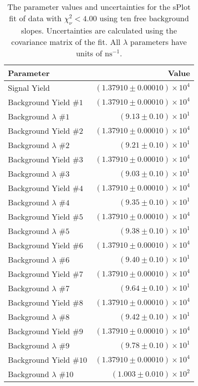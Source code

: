
\begin{table}[ht]
    \begin{center}
        \begin{tabular}{lr}\toprule
            Parameter & Value \\\midrule
            Signal Yield & $(1.37910 \pm 0.00010) \times 10^{4}$ \\
            Background Yield $\#1$ & $(1.37910 \pm 0.00010) \times 10^{4}$ \\
            Background $\lambda$ $\#1$ & $(9.13 \pm 0.10) \times 10^{1}$ \\
            Background Yield $\#2$ & $(1.37910 \pm 0.00010) \times 10^{4}$ \\
            Background $\lambda$ $\#2$ & $(9.21 \pm 0.10) \times 10^{1}$ \\
            Background Yield $\#3$ & $(1.37910 \pm 0.00010) \times 10^{4}$ \\
            Background $\lambda$ $\#3$ & $(9.03 \pm 0.10) \times 10^{1}$ \\
            Background Yield $\#4$ & $(1.37910 \pm 0.00010) \times 10^{4}$ \\
            Background $\lambda$ $\#4$ & $(9.35 \pm 0.10) \times 10^{1}$ \\
            Background Yield $\#5$ & $(1.37910 \pm 0.00010) \times 10^{4}$ \\
            Background $\lambda$ $\#5$ & $(9.38 \pm 0.10) \times 10^{1}$ \\
            Background Yield $\#6$ & $(1.37910 \pm 0.00010) \times 10^{4}$ \\
            Background $\lambda$ $\#6$ & $(9.40 \pm 0.10) \times 10^{1}$ \\
            Background Yield $\#7$ & $(1.37910 \pm 0.00010) \times 10^{4}$ \\
            Background $\lambda$ $\#7$ & $(9.64 \pm 0.10) \times 10^{1}$ \\
            Background Yield $\#8$ & $(1.37910 \pm 0.00010) \times 10^{4}$ \\
            Background $\lambda$ $\#8$ & $(9.42 \pm 0.10) \times 10^{1}$ \\
            Background Yield $\#9$ & $(1.37910 \pm 0.00010) \times 10^{4}$ \\
            Background $\lambda$ $\#9$ & $(9.78 \pm 0.10) \times 10^{1}$ \\
            Background Yield $\#10$ & $(1.37910 \pm 0.00010) \times 10^{4}$ \\
            Background $\lambda$ $\#10$ & $(1.003 \pm 0.010) \times 10^{2}$ \\\bottomrule
        \end{tabular}
        \caption{The parameter values and uncertainties for the sPlot fit of data with $\chi^2_\nu < 4.00$ using ten free background slopes. Uncertainties are calculated using the covariance matrix of the fit. All $\lambda$ parameters have units of $\si{\nano\second}^{-1}$.}\label{tab:splot-fit-results-chisqdof-4.00-free-10}
    \end{center}
\end{table}
